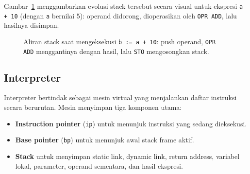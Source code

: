 \documentclass[11pt,a4paper]{article}
\begin{document}
Gambar~\ref{fig:stacktrace} menggambarkan evolusi stack tersebut secara visual
untuk ekspresi \texttt{a + 10} (dengan \texttt{a} bernilai 5): operand didorong,
dioperasikan oleh \texttt{OPR ADD}, lalu hasilnya disimpan.

\begin{figure}[H]
\centering
{}
\caption{Aliran stack saat mengeksekusi \texttt{b := a + 10}: push operand,
\texttt{OPR ADD} menggantinya dengan hasil, lalu \texttt{STO} mengosongkan stack.}
\label{fig:stacktrace}
\end{figure}

\subsection{Interpreter}

Interpreter bertindak sebagai mesin virtual yang menjalankan daftar instruksi
secara berurutan. Mesin menyimpan tiga komponen utama:

\begin{itemize}
    \item \textbf{Instruction pointer} (\texttt{ip}) untuk menunjuk instruksi
          yang sedang dieksekusi.
    \item \textbf{Base pointer} (\texttt{bp}) untuk menunjuk awal stack frame
          aktif.
    \item \textbf{Stack} untuk menyimpan static link, dynamic link, return
          address, variabel lokal, parameter, operand sementara, dan hasil
          ekspresi.
\end{itemize}
\end{document}

